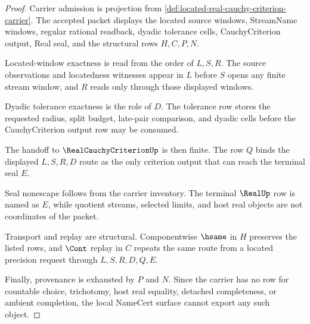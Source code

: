 \begin{proof}
Carrier admission is projection from \autoref{def:located-real-cauchy-criterion-carrier}. The accepted packet displays the located source windows, StreamName windows, regular rational readback, dyadic tolerance cells, CauchyCriterion output, Real seal, and the structural rows $H,C,P,N$.

Located-window exactness is read from the order of $L,S,R$. The source observations and locatedness witnesses appear in $L$ before $S$ opens any finite stream window, and $R$ reads only through those displayed windows.

Dyadic tolerance exactness is the role of $D$. The tolerance row stores the requested radius, split budget, late-pair comparison, and dyadic cells before the CauchyCriterion output row may be consumed.

The handoff to $\RealCauchyCriterionUp$ is then finite. The row $Q$ binds the displayed $L,S,R,D$ route as the only criterion output that can reach the terminal seal $E$.

Seal nonescape follows from the carrier inventory. The terminal $\RealUp$ row is named as $E$, while quotient streams, selected limits, and host real objects are not coordinates of the packet.

Transport and replay are structural. Componentwise $\hsame$ in $H$ preserves the listed rows, and $\Cont$ replay in $C$ repeats the same route from a located precision request through $L,S,R,D,Q,E$.

Finally, provenance is exhausted by $P$ and $N$. Since the carrier has no row for countable choice, trichotomy, host real equality, detached completeness, or ambient completion, the local NameCert surface cannot export any such object.
\end{proof}

